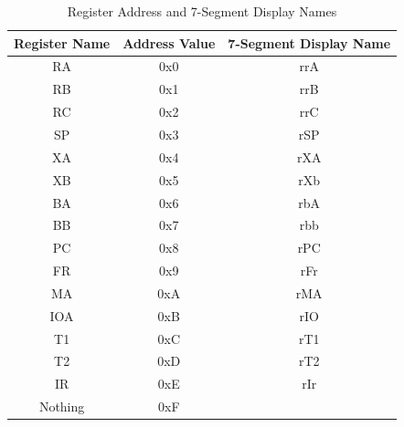 \documentclass{article}
\begin{document}
\begin{table}[h!]
    \centering
    \begin{tabular}{|c|c|c|}
        \hline
        \textbf{Register Name} & \textbf{Address Value} & \textbf{7-Segment Display Name} \\
        \hline
        RA & 0x0 & rrA \\
        \hline
        RB & 0x1 & rrB \\
        \hline
        RC & 0x2 & rrC \\
        \hline
        SP & 0x3 & rSP \\
        \hline
        XA & 0x4 & rXA \\
        \hline
        XB & 0x5 & rXb \\
        \hline
        BA & 0x6 & rbA \\
        \hline
        BB & 0x7 & rbb \\
        \hline
        PC & 0x8 & rPC \\
        \hline
        FR & 0x9 & rFr \\
        \hline
        MA & 0xA & rMA \\
        \hline
        IOA & 0xB & rIO \\
        \hline
        T1 & 0xC & rT1 \\
        \hline
        T2 & 0xD & rT2 \\
        \hline
        IR & 0xE & rIr \\
        \hline
        Nothing & 0xF &  \\
        \hline
    \end{tabular}
    \caption{Register Address and 7-Segment Display Names}
    \label{tab:registers}
\end{table}
\end{document}
